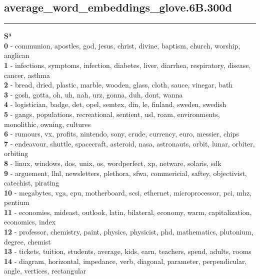 \subsection{average_word_embeddings_glove.6B.300d}\vspace{2mm}
\hrule\vspace{2mm}
\noindent
\textbf{S³}\vspace{2mm}\\
\vspace{2mm}
\noindent
\textbf{0} - communion, apostles, god, jesus, christ, divine, baptism, church, worship, anglican\\
\textbf{1} - infections, symptoms, infection, diabetes, liver, diarrhea, respiratory, disease, cancer, asthma\\
\textbf{2} - bread, dried, plastic, marble, wooden, glass, cloth, sauce, vinegar, bath\\
\textbf{3} - gosh, gotta, oh, uh, nah, urz, gonna, duh, dont, wanna\\
\textbf{4} - logistician, badge, det, opel, semtex, din, le, finland, sweden, swedish\\
\textbf{5} - gangs, populations, recreational, sentient, usl, roam, environments, monolithic, owning, cultures\\
\textbf{6} - rumours, vx, profits, nintendo, sony, crude, currency, euro, messier, chips\\
\textbf{7} - endeavour, shuttle, spacecraft, asteroid, nasa, astronauts, orbit, lunar, orbiter, orbiting\\
\textbf{8} - linux, windows, dos, unix, os, wordperfect, xp, netware, solaris, sdk\\
\textbf{9} - arguement, llnl, newsletters, plethora, sfwa, commericial, saftey, objectivist, catechist, pirating\\
\textbf{10} - megabytes, vga, cpu, motherboard, scsi, ethernet, microprocessor, pci, mhz, pentium\\
\textbf{11} - economies, mideast, outlook, latin, bilateral, economy, warm, capitalization, economics, index\\
\textbf{12} - professor, chemistry, paint, physics, physicist, phd, mathematics, plutonium, degree, chemist\\
\textbf{13} - tickets, tuition, students, average, kids, earn, teachers, spend, adults, rooms\\
\textbf{14} - diagram, horizontal, impedance, verb, diagonal, parameter, perpendicular, angle, vertices, rectangular\\
